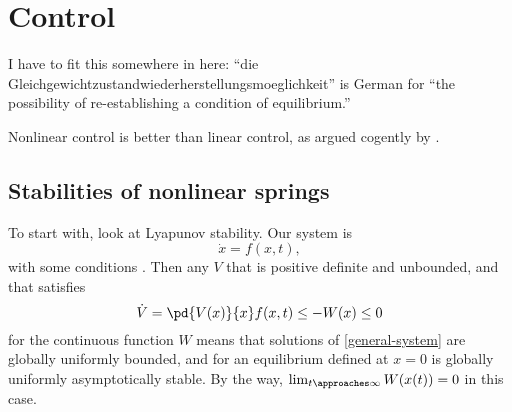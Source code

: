 
\chapter{Control}


I have to fit this somewhere in here: ``die
Gleichgewichtzustandwiederherstellungsmoeglichkeit'' is German for
``the possibility of re-establishing a condition of equilibrium.''

Nonlinear control is better than linear control, as argued cogently by \textcite{kokotovic1992}.


\section{Stabilities of nonlinear springs}

To start with, look at Lyapunov stability. Our system is
\begin{dmath}[label=general-system]
\dot x = f(x,t),
\end{dmath}
with some conditions \cite[pg.\,22]{krstic1995}. Then any $V$ that
is positive definite and unbounded, and that satisfies
\begin{dmath}
\dot V = \pd{V(x)}{x}f(x,t) \leq -W(x) \leq 0
\end{dmath}
for the continuous function $W$ means that solutions of
\eqref{general-system} are globally uniformly bounded, and for an
equilibrium defined at $x=0$ is globally uniformly asymptotically
stable. By the way, $\lim_{t\approaches\infty}W(x(t))=0$ in this
case.

